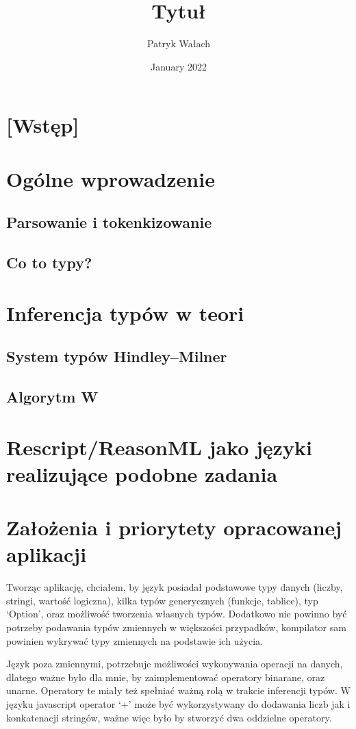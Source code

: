 \documentclass{article}
\title{Tytuł}
\author{Patryk Wałach}
\date{January 2022}
\begin{document}
\maketitle

\section{[Wstęp]}

\section{Ogólne wprowadzenie}
\subsection{Parsowanie i tokenkizowanie}
\subsection{Co to typy?}
\section{Inferencja typów w teori}
\subsection{System typów Hindley–Milner}
\subsection{Algorytm W}
\section{Rescript/ReasonML jako języki realizujące podobne zadania}
\section{Założenia i priorytety opracowanej aplikacji}
Tworząc aplikację, chciałem, by język posiadał podstawowe typy danych (liczby, stringi, wartość logiczna), kilka typów generycznych (funkcje, tablice), typ `Option', oraz możliwość tworzenia własnych typów.
Dodatkowo nie powinno być potrzeby podawania typów zmiennych w większości przypadków, kompilator sam powinien wykrywać typy zmiennych na podstawie ich użycia.
 

Język poza zmiennymi, potrzebuje możliwości wykonywania operacji na danych, dlatego ważne było dla mnie, by zaimplementować operatory binarane, oraz unarne. Operatory te miały też spełniać ważną rolą w trakcie inferencji typów. W języku javascript operator `+' może być wykorzystywany do dodawania liczb jak i konkatenacji stringów, ważne więc było by stworzyć dwa oddzielne operatory.
\end{document}
